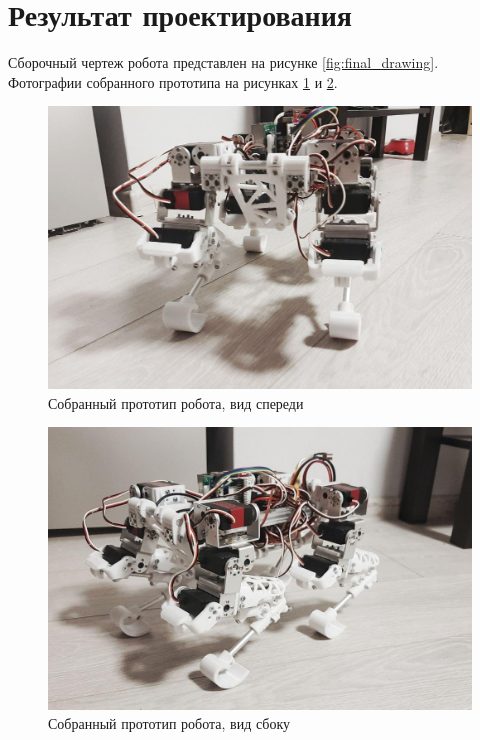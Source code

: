 \section*{Результат проектирования}

Сборочный чертеж робота представлен на рисунке \ref{fig:final_drawing}. Фотографии собранного прототипа на рисунках \ref{fig:final_assembly1} и \ref{fig:final_assembly2}.

\begin{figure}[h]
    \centering
    \includegraphics[width=\textwidth]{chapter_mechanics_construction/figure24.jpg}
    \caption{Собранный прототип робота, вид спереди}
    \label{fig:final_assembly1}
\end{figure}

\begin{figure}[h]
    \centering
    \includegraphics[width=\textwidth]{chapter_mechanics_construction/figure25.jpg}
    \caption{Собранный прототип робота, вид сбоку}
    \label{fig:final_assembly2}
\end{figure}

